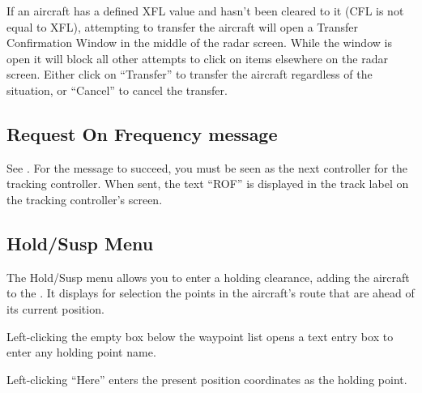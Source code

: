 \documentclass[a4paper,oneside,11pt]{memoir}
\begin{document}
If an aircraft has a defined XFL value and hasn’t been cleared to it (CFL is not equal to XFL), attempting to transfer the aircraft will open a Transfer Confirmation Window in the middle of the radar screen. While the window is open it will block all other attempts to click on items elsewhere on the radar screen. Either click on “Transfer” to transfer the aircraft regardless of the situation, or “Cancel” to cancel the transfer.

\subsection{Request On Frequency message}
\label{menu:rof}

See . For the message to succeed, you must be seen as the next controller for the tracking controller. When sent, the text “ROF” is displayed in the track label on the tracking controller’s screen.


\subsection{Hold/Susp Menu}
\label{menu:hold}


The Hold/Susp menu allows you to enter a holding clearance, adding the aircraft to the . It displays for selection the points in the aircraft’s route that are ahead of its current position.

\bigskip

Left-clicking the empty box below the waypoint list opens a text entry box to enter any holding point name.

\bigskip

Left-clicking “Here” enters the present position coordinates as the holding point.

\bigskip
\end{document}
